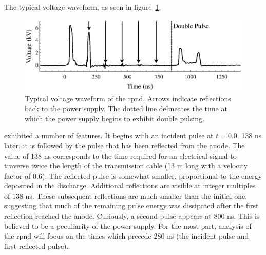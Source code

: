 The typical voltage waveform, as seen in figure~\ref{fig:waveform},
\begin{figure}
  \centering
  \includegraphics{./chapters/experiment/figures/waveform.eps}
  \caption{Typical voltage waveform of the \acs{rpnd}. Arrows indicate
    reflections back to the power supply. The dotted line delineates the time at
    which the power supply begins to exhibit double pulsing.}
  \label{fig:waveform}
\end{figure}
exhibited a number of features. It begins with an incident pulse at $t = 0.0$.
138 ns later, it is followed by the pulse that has been reflected from the
anode. The value of 138 ns corresponds to the time required for an electrical
signal to traverse twice the length of the transmission cable (13 m long with a
velocity factor of 0.6). The reflected pulse is somewhat smaller, proportional
to the energy deposited in the discharge. Additional reflections are visible at
integer multiples of 138 ns. These subsequent reflections are much smaller than
the initial one, suggesting that much of the remaining pulse energy was
dissipated after the first reflection reached the anode. Curiously, a second
pulse appears at 800 ns. This is believed to be a peculiarity of the power
supply. For the most part, analysis of the \acs{rpnd} will focus on the times
which precede 280 ns (the incident pulse and first reflected pulse).

